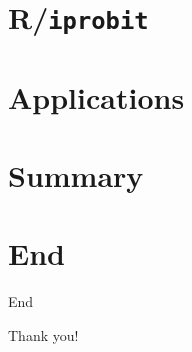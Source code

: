 \documentclass{beamer}
\begin{document}
\section{R/\texttt{iprobit}}
\transition


\section{Applications}
\transition


\section{Summary}
\transition


\section*{End}

{
\framenonumber
\begin{frame}[noframenumbering]{End}
\begin{center}
\Huge Thank you!
\end{center}
\end{frame}
}

\appendix


\end{document}
